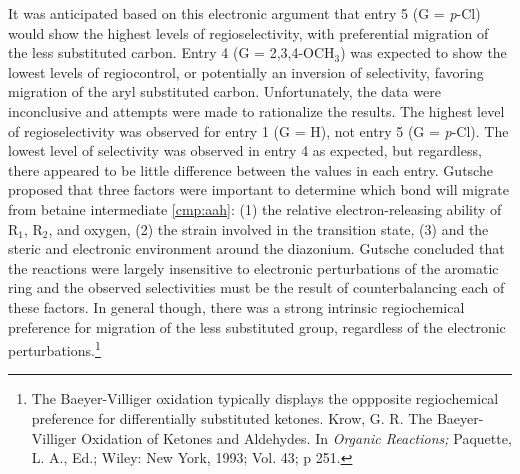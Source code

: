 It was anticipated based on this electronic argument that entry 5 (G = \textit{p}-Cl) would show
the highest levels of regioselectivity, with preferential migration of the less substituted carbon.
Entry 4 (G = 2,3,4-OCH$_3$) was expected to show the lowest levels of regiocontrol, or potentially
an inversion of selectivity, favoring migration of the aryl substituted carbon.
Unfortunately, the data were inconclusive and attempts were made to rationalize the results. The
highest level of regioselectivity was observed for entry 1 (G = H), not entry 5 (G =
\textit{p}-Cl). The lowest level of selectivity was observed in entry 4 as
expected, but regardless, there appeared to be little difference between the values in each entry. Gutsche
proposed that three factors were important to determine which bond will migrate from betaine
intermediate \ref{cmp:aah}: (1) the relative electron-releasing ability of R$_1$, R$_2$, and oxygen,
(2) the strain involved in the transition state, (3) and the steric and electronic environment
around the diazonium. Gutsche concluded that the reactions were largely insensitive to electronic
perturbations of the aromatic ring and the observed selectivities must be the result of counterbalancing each of these factors. In general though, there was a strong intrinsic regiochemical preference for migration of the less substituted group, regardless of the electronic perturbations.\footnote{The Baeyer-Villiger oxidation typically displays
the oppposite regiochemical preference for differentially substituted ketones. {\frenchspacing Krow,
G.
R.
The Baeyer-Villiger Oxidation of Ketones and Aldehydes. In \textit{Organic Reactions;} Paquette, L. A., Ed.; Wiley: New York,
1993; Vol. 43; p 251.}}


